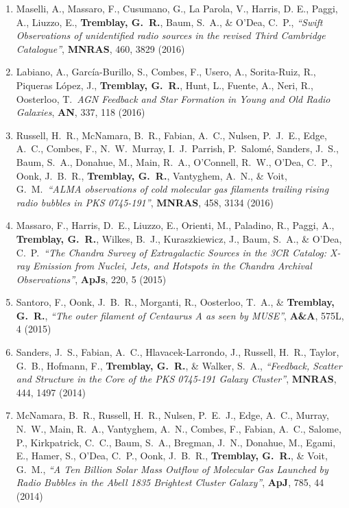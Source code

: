 \documentclass[11pt]{article}
\begin{document}
\begin{enumerate}[resume]
\item Maselli, A., Massaro, F., Cusumano, G., La Parola, V., Harris, D. E., Paggi, A., Liuzzo, E., {\bf Tremblay, G.~R.},
Baum, S.~A., \& O'Dea, C.~P., {\it ``Swift Observations of unidentified radio sources in the revised Third Cambridge Catalogue''}, \textbf{MNRAS}, 460, 3829 (2016)

\item Labiano, A., Garc\'{i}a-Burillo, S., Combes, F., Usero, A., Sorita-Ruiz, R., Piqueras L\'{o}pez, J., {\bf Tremblay, G.~R.}, Hunt, L., Fuente, A., Neri, R., 
Oosterloo, T.\ {\it AGN Feedback and Star Formation in Young and Old Radio Galaxies}, \textbf{AN}, 337, 118 (2016)

\item Russell, H.~R., McNamara, B.~R., Fabian, A.~C., Nulsen, P.~J.~E., Edge, A.~C., Combes, F., N.~W.~Murray, I.~J.~Parrish, P.~Salom\'{e}, Sanders, J.~S., Baum, S.~A., Donahue, M., Main, R.~A., 
O'Connell, R.~W., O'Dea, C.~P., Oonk, J.~B.~R., {\bf Tremblay, G.~R.}, Vantyghem, A.~N., \& Voit, G.~M.\ {\it ``ALMA observations of cold molecular gas filaments trailing rising radio bubbles in PKS 0745-191''}, \textbf{MNRAS}, 458, 3134 (2016)


\item Massaro, F., Harris, D.~E., Liuzzo, E., Orienti, M., Paladino, R., Paggi, A., {\bf Tremblay, G.~R.}, Wilkes, B.~J., Kuraszkiewicz, J., Baum, S.~A., \& O'Dea, C.~P.\ {\it ``The Chandra Survey of Extragalactic Sources in the 3CR Catalog: X-ray Emission from Nuclei, Jets, and Hotspots in the Chandra Archival Observations''}, \textbf{ApJs}, 220, 5 (2015)


\item Santoro, F., Oonk, J.~B.~R., Morganti, R., Oosterloo, T.~A., \& {\bf Tremblay, G.~R.},  {\it ``The outer filament of Centaurus A as seen by MUSE''}, \textbf{A\&A}, 575L, 4 (2015)


\item Sanders, J.~S., Fabian, A.~C., Hlavacek-Larrondo, J., Russell, H.~R., Taylor, G.~B., Hofmann, F., {\bf Tremblay, G.~R.}, \& Walker, S.~A.,  {\it ``Feedback, Scatter and Structure in the Core of the PKS 0745-191 Galaxy Cluster''}, \textbf{MNRAS}, 444, 1497 (2014)


\item McNamara, B.~R., Russell, H.~R., Nulsen, P.~E.~J., Edge, A.~C., Murray, 
N.~W., Main, R.~A., Vantyghem, A.~N., Combes, F., Fabian, A.~C., Salome, 
P., Kirkpatrick, C.~C., Baum, S.~A., Bregman, J.~N., Donahue, M., Egami, 
E., Hamer, S., O'Dea, C.~P., Oonk, J.~B.~R., {\bf Tremblay, G.~R.}, 
\& Voit, G.~M., {\it ``A Ten Billion Solar Mass Outflow of Molecular Gas Launched by Radio Bubbles in the Abell 1835 Brightest Cluster Galaxy''}, \textbf{ApJ}, 785, 44 (2014)



\end{enumerate}
\end{document}
